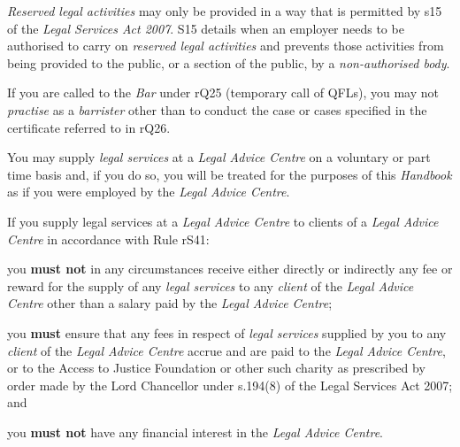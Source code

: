 
\emph{Reserved legal activities} may only be provided in a way that is
permitted by s15 of the \emph{Legal Services Act 2007}. S15 details when
an employer needs to be authorised to carry on \emph{reserved legal
activities} and prevents those activities from being provided to the
public, or a section of the public, by a \emph{non-authorised body}.




If you are called to the \emph{Bar} under rQ25 (temporary call of QFLs),
you may not \emph{practise} as a \emph{barrister} other than to conduct
the case or cases specified in the certificate referred to in rQ26.




You may supply \emph{legal services} at a \emph{Legal Advice Centre} on
a voluntary or part time basis and, if you do so, you will be treated
for the purposes of this \emph{Handbook} as if you were employed by the
\emph{Legal Advice Centre}.


If you supply legal services at a \emph{Legal Advice Centre} to clients
of a \emph{Legal Advice Centre} in accordance with Rule rS41:\nl\item you \textcolor{myred}{\textbf{must not }}in any circumstances receive either directly or
indirectly any fee or reward for the supply of any \emph{legal services}
to any \emph{client} of the \emph{Legal Advice Centre} other than a
salary paid by the \emph{Legal Advice Centre};
\item you \textcolor{myred}{\textbf{must }}ensure that any fees in respect of \emph{legal services}
supplied by you to any \emph{client} of the \emph{Legal Advice Centre}
accrue and are paid to the \emph{Legal Advice Centre}, or to the Access
to Justice Foundation or other such charity as prescribed by order made
by the Lord Chancellor under s.194(8) of the Legal Services Act 2007;
and
\item you \textcolor{myred}{\textbf{must not }}have any financial interest in the \emph{Legal Advice
Centre}.
\ln




